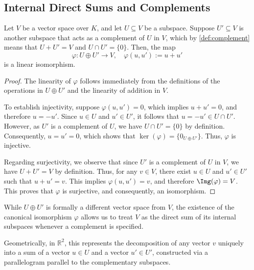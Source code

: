 \subsection{Internal Direct Sums and Complements}

\begin{proposition}
  \label{prop:direct_sum_complement}
  Let $V$ be a vector space over $K$, and let $U \subseteq V$ be a subspace. Suppose $U' \subseteq V$ is another subspace that acts as a complement of $U$ in $V$, which by \cref{def:complement} means that $U + U' = V$ and $U \cap U' = \{0\}$. Then, the map
  \[
  \varphi \colon U \oplus U' \to V, \quad \varphi(u, u') := u + u'
  \]
  is a linear isomorphism.
\end{proposition}

\begin{proof}
  The linearity of $\varphi$ follows immediately from the definitions of the operations in $U \oplus U'$ and the linearity of addition in $V$.

  To establish injectivity, suppose $\varphi(u, u') = 0$, which implies $u + u' = 0$, and therefore $u = -u'$. Since $u \in U$ and $u' \in U'$, it follows that $u = -u' \in U \cap U'$. However, as $U'$ is a complement of $U$, we have $U \cap U' = \{0\}$ by definition. Consequently, $u = u' = 0$, which shows that $\ker(\varphi) = \{0_{U \oplus U'}\}$. Thus, $\varphi$ is injective.

  Regarding surjectivity, we observe that since $U'$ is a complement of $U$ in $V$, we have $U + U' = V$ by definition. Thus, for any $v \in V$, there exist $u \in U$ and $u' \in U'$ such that $u + u' = v$. This implies $\varphi(u, u') = v$, and therefore $\Img(\varphi) = V$. This proves that $\varphi$ is surjective, and consequently, an isomorphism.
\end{proof}

\begin{remark}
  While $U \oplus U'$ is formally a different vector space from $V$, the existence of the canonical isomorphism $\varphi$ allows us to treat $V$ as the direct sum of its internal subspaces whenever a complement is specified.
\end{remark}

Geometrically, in $\mathbb{R}^2$, this represents the decomposition of any vector $v$ uniquely into a sum of a vector $u \in U$ and a vector $u' \in U'$, constructed via a parallelogram parallel to the complementary subspaces.

